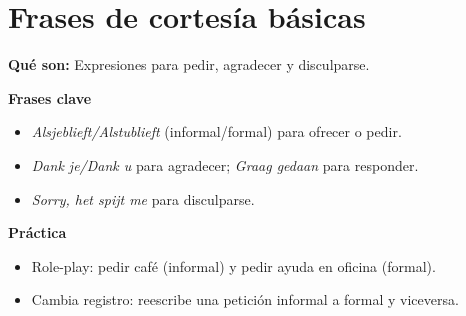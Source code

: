 \section{Frases de cortesía básicas}
\textbf{Qué son:} Expresiones para pedir, agradecer y disculparse.

\textbf{Frases clave}
\begin{itemize}[leftmargin=*]
  \item \textit{Alsjeblieft/Alstublieft} (informal/formal) para ofrecer o pedir.
  \item \textit{Dank je/Dank u} para agradecer; \textit{Graag gedaan} para responder.
  \item \textit{Sorry, het spijt me} para disculparse.
\end{itemize}

\textbf{Práctica}
\begin{itemize}[leftmargin=*]
  \item Role-play: pedir café (informal) y pedir ayuda en oficina (formal).
  \item Cambia registro: reescribe una petición informal a formal y viceversa.
\end{itemize}
